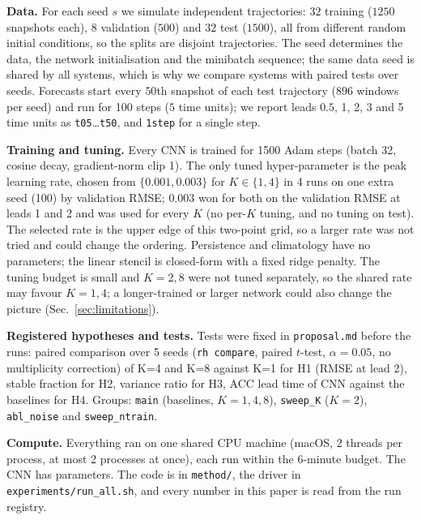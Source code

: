 \textbf{Data.} For each seed $s$ we simulate independent trajectories: $32$ training ($1250$ snapshots each), $8$ validation ($500$) and $32$ test ($1500$), all from different random initial conditions, so the splits are disjoint trajectories. The seed determines the data, the network initialisation and the minibatch sequence; the same data seed is shared by all systems, which is why we compare systems with paired tests over seeds. Forecasts start every $50$th snapshot of each test trajectory ($896$ windows per seed) and run for 100 steps ($5$ time units); we report leads $0.5$, 1, 2, 3 and 5 time units as \texttt{t05}\ldots\texttt{t50}, and \texttt{1step} for a single step.

\textbf{Training and tuning.} Every CNN is trained for 1500 Adam steps (batch 32, cosine decay, gradient-norm clip 1). The only tuned hyper-parameter is the peak learning rate, chosen from $\{0.001,0.003\}$ for $K\in\{1,4\}$ in 4 runs on one extra seed (100) by validation RMSE; $0.003$ won for both on the validation RMSE at leads 1 and 2 and was used for every $K$ (no per-$K$ tuning, and no tuning on test). The selected rate is the upper edge of this two-point grid, so a larger rate was not tried and could change the ordering. Persistence and climatology have no parameters; the linear stencil is closed-form with a fixed ridge penalty. The tuning budget is small and $K{=}2,8$ were not tuned separately, so the shared rate may favour $K{=}1,4$; a longer-trained or larger network could also change the picture (Sec.~\ref{sec:limitations}).

\textbf{Registered hypotheses and tests.} Tests were fixed in \texttt{proposal.md} before the runs: paired comparison over 5 seeds (\texttt{rh compare}, paired $t$-test, $\alpha{=}0.05$, no multiplicity correction) of K=4 and K=8 against K=1 for H1 (RMSE at lead 2), stable fraction for H2, variance ratio for H3, ACC lead time of CNN against the baselines for H4. Groups: \texttt{main} (baselines, $K{=}1,4,8$), \texttt{sweep\_K} ($K{=}2$), \texttt{abl\_noise} and \texttt{sweep\_ntrain}.

\textbf{Compute.} Everything ran on one shared CPU machine (macOS, 2 threads per process, at most 2 processes at once), each run within the 6-minute budget. The CNN has  parameters. The code is in \texttt{method/}, the driver in \texttt{experiments/run\_all.sh}, and every number in this paper is read from the run registry.
